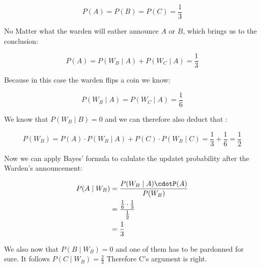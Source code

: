 \documentclass{article}
\begin{document}
\[P(A) = P(B)= P(C) = \frac{1}{3} \]

No Matter what the warden will eather announce $A$ or $B$, which brings us to the conclusion:

\[P(A)= P(W_B \mid A) + P(W_C \mid A) =\frac{1}{3}\]

Because in this case the warden flips a coin we know:

\[ P(W_B \mid A)= P(W_C \mid A) = \frac{1}{6} \]

We know that $P(W_B\mid B) = 0$  and we can therefore also  deduct that :

\[ P(W_B)= P(A) \cdot P(W_B \mid A) + P(C) \cdot P(W_B\mid C) = \frac{1}{3}+\frac{1}{6}=\frac{1}{2}\]

Now we can apply Bayes' formula to calulate the updatet probability after the Warden's announcement:

\begin{align*}
 P(A \mid W_B)&=\frac{P(W_B \mid A)\cdotP(A)}{P(W_B)} \\
&= \frac{\frac{1}{6} \cdot \frac{1}{3} }{\frac{1}{2}} \\
&=\frac{1}{3}
\end{align*}

We also now that $P(B \mid W_B)=0$ and one of them has to be pardonned for sure. It follows $P(C \mid W_B)=\frac{2}{3}$
Therefore C's argument is right.
\end{document}
